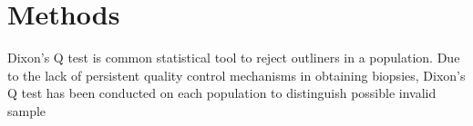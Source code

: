 \chapter{Methods}

Dixon's Q test is common statistical tool to reject outliners in a population. Due to the lack of persistent quality control mechanisms in obtaining biopsies, Dixon's Q test has been conducted on each population to distinguish possible invalid sample